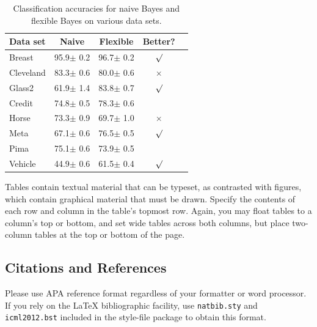\documentclass{article}
\begin{document}

\begin{table}[t]
\caption{Classification accuracies for naive Bayes and flexible 
Bayes on various data sets.}
\label{sample-table}
\vskip 0.15in
\begin{center}
\begin{small}
\begin{sc}
\begin{tabular}{lcccr}
\hline
\abovespace\belowspace
Data set & Naive & Flexible & Better? \\
\hline
\abovespace
Breast    & 95.9$\pm$ 0.2& 96.7$\pm$ 0.2& $\surd$ \\
Cleveland & 83.3$\pm$ 0.6& 80.0$\pm$ 0.6& $\times$\\
Glass2    & 61.9$\pm$ 1.4& 83.8$\pm$ 0.7& $\surd$ \\
Credit    & 74.8$\pm$ 0.5& 78.3$\pm$ 0.6&         \\
Horse     & 73.3$\pm$ 0.9& 69.7$\pm$ 1.0& $\times$\\
Meta      & 67.1$\pm$ 0.6& 76.5$\pm$ 0.5& $\surd$ \\
Pima      & 75.1$\pm$ 0.6& 73.9$\pm$ 0.5&         \\
\belowspace
Vehicle   & 44.9$\pm$ 0.6& 61.5$\pm$ 0.4& $\surd$ \\
\hline
\end{tabular}
\end{sc}
\end{small}
\end{center}
\vskip -0.1in
\end{table}

Tables contain textual material that can be typeset, as contrasted 
with figures, which contain graphical material that must be drawn. 
Specify the contents of each row and column in the table's topmost
row. Again, you may float tables to a column's top or bottom, and set
wide tables across both columns, but place two-column tables at the
top or bottom of the page.
 
\subsection{Citations and References} 

Please use APA reference format regardless of your formatter
or word processor. If you rely on the \LaTeX\/ bibliographic 
facility, use {\tt natbib.sty} and {\tt icml2012.bst} 
included in the style-file package to obtain this format.
\end{document}
